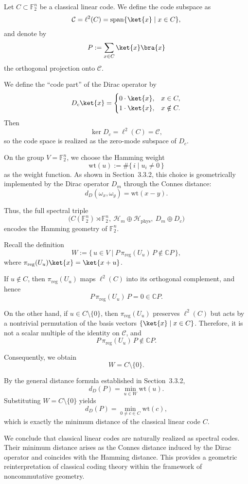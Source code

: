 \documentclass[12pt]{article}
\theoremstyle{definition} %
\theoremstyle{plain} %
\theoremstyle{remark} %
\theoremstyle{underline}
\begin{document}
Let $C\subset\mathbb{F}_2^n$ be a classical linear code.
We define the code subspace as
\[
    \mathcal{C}=\ell^2(C)=\mathrm{span}\{\ket{x}\mid x\in C\},
\]
and denote by
\[
    P:=\sum_{x\in C}\ket{x}\bra{x}
\]
the orthogonal projection onto $\mathcal{C}$.

We define the ``code part'' of the Dirac operator by
\[
    D_c\ket{x}=
    \begin{cases}
        0\cdot\ket{x}, & x\in C,\\
        1\cdot\ket{x}, & x\notin C.
    \end{cases}
\]
Then
\[
    \ker D_c=\ell^2(C)=\mathcal{C},
\]
so the code space is realized as the zero-mode subspace of $D_c$.

On the group $V=\mathbb{F}_2^n$, we choose the Hamming weight
\[
    \mathrm{wt}(u):=\#\{\,i\mid u_i\neq 0\,\}
\]
as the weight function.
As shown in Section~3.3.2, this choice is geometrically implemented by the Dirac operator $D_m$ through the Connes distance:
\[
    d_D(\omega_x,\omega_y)=\mathrm{wt}(x-y).
\]

Thus, the full spectral triple
\[
    \bigl(C(\mathbb{F}_2^n)\rtimes \mathbb{F}_2^n,\ 
    \mathcal{H}_m\oplus\mathcal{H}_{\mathrm{phys}},\ 
    D_m\oplus D_c\bigr)
\]
encodes the Hamming geometry of $\mathbb{F}_2^n$.

Recall the definition
\[
    W:=\{\,u\in V\mid P\,\pi_{\mathrm{reg}}(U_u)\,P\notin\mathbb{C}P\,\},
\]
where $\pi_{\mathrm{reg}}(U_u)\ket{x}=\ket{x+u}$.

If $u\notin C$, then $\pi_{\mathrm{reg}}(U_u)$ maps $\ell^2(C)$ into its orthogonal
complement, and hence
\[
    P\,\pi_{\mathrm{reg}}(U_u)\,P=0\in\mathbb{C}P.
\]

On the other hand, if $u\in C\setminus\{0\}$, then $\pi_{\mathrm{reg}}(U_u)$ preserves $\ell^2(C)$ but acts by a nontrivial permutation of the basis vectors $\{\ket{x}\mid x\in C\}$. Therefore, it is not a scalar multiple of the identity on $\mathcal{C}$, and
\[
    P\,\pi_{\mathrm{reg}}(U_u)\,P\notin\mathbb{C}P.
\]

Consequently, we obtain
\[
    W=C\setminus\{0\}.
\]

By the general distance formula established in Section~3.3.2,
\[
    d_D(P)=\min_{u\in W}\mathrm{wt}(u).
\]
Substituting $W=C\setminus\{0\}$ yields
\[
    d_D(P)=\min_{0\neq c\in C}\mathrm{wt}(c),
\]
which is exactly the minimum distance of the classical linear code $C$.

We conclude that classical linear codes are naturally realized as spectral codes.
Their minimum distance arises as the Connes distance induced by the Dirac operator and coincides with the Hamming distance. This provides a geometric reinterpretation of classical coding theory within the framework of noncommutative geometry.
\end{document}
